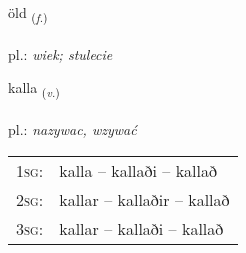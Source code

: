 \documentclass[frontgrid, backgrid]{flacards}\usepackage[]{graphicx}\usepackage[]{xcolor}
\begin{document}
\renewcommand{\blhead}{\vskip5pt {\small\bfseries\footnotesize Nafnorð | Noun }}
\renewcommand{\bcfoot}{\vskip5pt \hspace{2pt}{\small\bfseries\footnotesize 1K}}


{öld \small{\textsubscript{(\textit{f.})}} \\[1ex] %
\textphonetic{[œlt]} \\
pl.: \emph{wiek; stulecie} \\  [2ex]
\renewcommand*{\arraystretch}{0.8}
}

\renewcommand{\flhead}{\vskip5pt \fboxsep=0pt {\small\bfseries\footnotesize Sagnorð | Verb}}
\renewcommand{\fcfoot}{\vskip5pt \fboxsep=0pt \hspace{2pt}{\small\bfseries\footnotesize 1K}}

\renewcommand{\blhead}{\vskip5pt {\small\bfseries\footnotesize Sagnorð | Verb }}
\renewcommand{\bcfoot}{\vskip5pt \hspace{2pt}{\small\bfseries\footnotesize 1K}}


{kalla \small{\textsubscript{(\textit{v.})}} \\[1ex] %
\textphonetic{[kʰatla]} \\
pl.: \emph{nazywac, wzywać} \\  [2ex]
\renewcommand*{\arraystretch}{0.8}
\begin{tabular}{p{1cm}l}
\textsc{1sg}: & kalla -- kallaði -- kallað \\ 
\textsc{2sg}: & kallar -- kallaðir -- kallað \\ 
\textsc{3sg}: & kallar -- kallaði -- kallað \\ 
\end{tabular}
}

\renewcommand{\flhead}{\vskip5pt \fboxsep=0pt {\small\bfseries\footnotesize Nafnorð | Noun}}
\renewcommand{\fcfoot}{\vskip5pt \fboxsep=0pt \hspace{2pt}{\small\bfseries\footnotesize 1K}}
\end{document}
